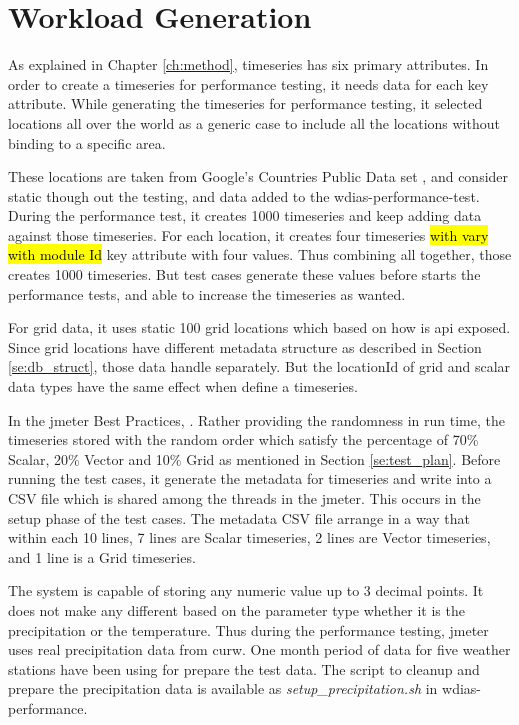 \section{Workload Generation}

As explained in Chapter \ref{ch:method}, timeseries has six primary attributes. In order to create a timeseries for performance testing, it needs data for each key attribute.
While generating the timeseries for performance testing, it selected locations all over the world as a generic case to include all the locations without binding to a specific area.

These locations are taken from Google's Countries Public Data set \cite{GoogleGoogleCounties}, and consider static though out the testing, and data added to the wdias-performance-test.
During the performance test, it creates 1000 timeseries and keep adding data against those timeseries. For each location, it creates four timeseries \hl{with vary with module Id} key attribute with four values. Thus combining all together, those creates 1000 timeseries. But test cases generate these values before starts the performance tests, and able to increase the timeseries as wanted.

For grid data, it uses static 100 grid locations which based on how is \acrshort{api} exposed. Since grid locations have different metadata structure as described in Section \ref{se:db_struct}, those data handle separately. But the locationId of grid and scalar data types have the same effect when define a timeseries.

In the \acrshort{jmeter} Best Practices, . Rather providing the randomness in run time, the timeseries stored with the random order which satisfy the percentage of 70\% Scalar, 20\% Vector and 10\% Grid as mentioned in Section \ref{se:test_plan}.
Before running the test cases, it generate the metadata for timeseries and write into a CSV file which is shared among the threads in the \acrshort{jmeter}. This occurs in the setup phase of the test cases. The metadata CSV file arrange in a way that within each 10 lines, 7 lines are Scalar timeseries, 2 lines are Vector timeseries, and 1 line is a Grid timeseries.

The system is capable of storing any numeric value up to 3 decimal points. It does not make any different based on the parameter type whether it is the precipitation or the temperature. Thus during the performance testing, \acrshort{jmeter} uses real precipitation data from \acrshort{curw}. One month period of data for five weather stations have been using for prepare the test data. The script to cleanup and prepare the precipitation data is available as \emph{setup\_precipitation.sh} in wdias-performance.


